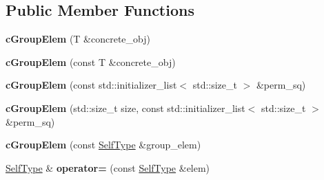 \subsection*{\-Public \-Member \-Functions}
\begin{DoxyCompactItemize}
\item 
\hypertarget{classcGroupElem_ac677380fd35b7307be8230e01c47d24a}{
{\bfseries c\-Group\-Elem} (\-T \&concrete\-\_\-obj)}
\label{classcGroupElem_ac677380fd35b7307be8230e01c47d24a}

\item 
\hypertarget{classcGroupElem_a7e61b42847fb382a00025af19baf2132}{
{\bfseries c\-Group\-Elem} (const \-T \&concrete\-\_\-obj)}
\label{classcGroupElem_a7e61b42847fb382a00025af19baf2132}

\item 
\hypertarget{classcGroupElem_a13a796803737218c08e3d6bb652732d1}{
{\bfseries c\-Group\-Elem} (const std\-::initializer\-\_\-list$<$ std\-::size\-\_\-t $>$ \&perm\-\_\-sq)}
\label{classcGroupElem_a13a796803737218c08e3d6bb652732d1}

\item 
\hypertarget{classcGroupElem_aaa558bbe798129dccc53712777e1bd4e}{
{\bfseries c\-Group\-Elem} (std\-::size\-\_\-t size, const std\-::initializer\-\_\-list$<$ std\-::size\-\_\-t $>$ \&perm\-\_\-sq)}
\label{classcGroupElem_aaa558bbe798129dccc53712777e1bd4e}

\item 
\hypertarget{classcGroupElem_af2fe12bf9a1291a5c30905449e2b3a2b}{
{\bfseries c\-Group\-Elem} (const \hyperlink{classcGroupElem}{\-Self\-Type} \&group\-\_\-elem)}
\label{classcGroupElem_af2fe12bf9a1291a5c30905449e2b3a2b}

\item 
\hypertarget{classcGroupElem_a75d7cd6508130c2632042fa42041b874}{
\hyperlink{classcGroupElem}{\-Self\-Type} \& {\bfseries operator=} (const \hyperlink{classcGroupElem}{\-Self\-Type} \&elem)}
\label{classcGroupElem_a75d7cd6508130c2632042fa42041b874}


\end{DoxyCompactItemize}
